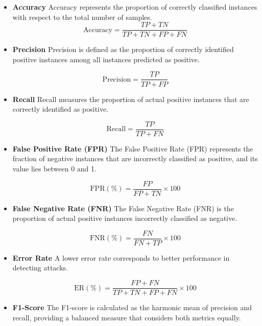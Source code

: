 \documentclass[a4paper,fleqn]{cas-sc}
\begin{document}
\begin{itemize}
\item \textbf{Accuracy}
Accuracy represents the proportion of correctly classified instances with respect to the total number of samples.
\begin{equation}
\mathrm{Accuracy} = \frac{TP + TN}{TP + TN + FP + FN}
\end{equation}

\item \textbf{Precision}
Precision is defined as the proportion of correctly identified positive instances among all instances predicted as positive.

\begin{equation}
\mathrm{Precision} = \frac{TP}{TP + FP}
\end{equation}

\item \textbf{Recall}
Recall measures the proportion of actual positive instances that are correctly identified as positive.

\begin{equation}
\mathrm{Recall} = \frac{TP}{TP + FN}
\end{equation}

\item \textbf{False Positive Rate (FPR)}
The False Positive Rate (FPR) represents the fraction of negative instances that are incorrectly classified as positive, and its value lies between 0 and 1.

\begin{equation}
\mathrm{FPR}(\%) = \frac{FP}{FP + TN} \times 100
\end{equation}

\item \textbf{False Negative Rate (FNR)}
The False Negative Rate (FNR) is the proportion of actual positive instances incorrectly classified as negative.

\begin{equation}
\mathrm{FNR}(\%) = \frac{FN}{FN + TP} \times 100
\end{equation}

\item \textbf{Error Rate}
A lower error rate corresponds to better performance in detecting attacks.

\begin{equation}
\mathrm{ER}(\%) = \frac{FP + FN}{TP + TN + FP + FN} \times 100
\end{equation}

\item \textbf{F1-Score}
The F1-score is calculated as the harmonic mean of precision and recall, providing a balanced measure that considers both metrics equally.


\end{itemize}
\end{document}
